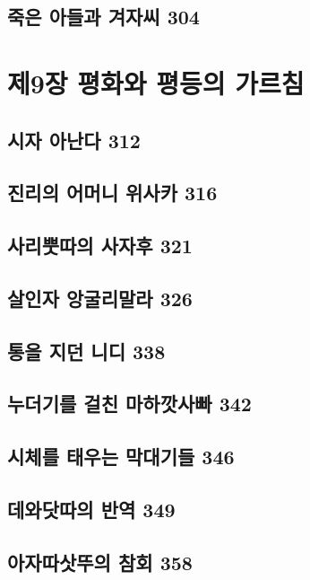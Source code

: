 \documentclass[12pt, a4paper, oneside]{book}
\let\stdsection\section
\renewcommand\section{\newpage\stdsection}
\begin{document}
	\section{죽은 아들과 겨자씨 304}




	\chapter{제9장 평화와 평등의 가르침}
	\noptcrule
	\parttoc				


	\section{시자 아난다 312 }

	\section{진리의 어머니 위사카 316 }

	\section{사리뿟따의 사자후 321 }

	\section{살인자 앙굴리말라 326 }

	\section{통을 지던 니디 338 }

	\section{누더기를 걸친 마하깟사빠 342 }

	\section{시체를 태우는 막대기들 346 }

	\section{데와닷따의 반역 349 }

	\section{아자따삿뚜의 참회 358}
\end{document}

